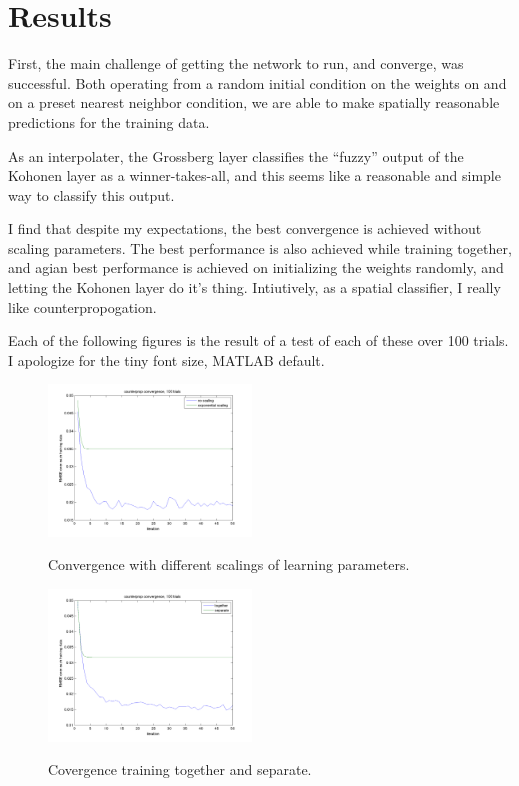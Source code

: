 \documentclass[pre,twocolumn,twoside,byrevtex,superscriptaddress]{revtex4}
\begin{document}
\section{Results}

First, the main challenge of getting the network to run, and converge, was successful.
Both operating from a random initial condition on the weights on and on a preset nearest neighbor condition, we are able to make spatially reasonable predictions for the training data.

As an interpolater, the Grossberg layer classifies the ``fuzzy'' output of the Kohonen layer as a winner-takes-all, and this seems like a reasonable and simple way to classify this output.

I find that despite my expectations, the best convergence is achieved without scaling parameters.
The best performance is also achieved while training together, and agian best performance is achieved on initializing the weights randomly, and letting the Kohonen layer do it's thing.
Intiutively, as a spatial classifier, I really like counterpropogation.

Each of the following figures is the result of a test of each of these over 100 trials.
I apologize for the tiny font size, MATLAB default.


\begin{figure}[h]
 \centering
  \includegraphics[width=0.48\textwidth]{117.png}
  \label{fig:7}
  \caption{Convergence with different scalings of learning parameters.}
\end{figure}

\begin{figure}[h]
 \centering
  \includegraphics[width=0.48\textwidth]{118.png}
  \label{fig:8}
  \caption{Covergence training together and separate.}
\end{figure}
\end{document}
